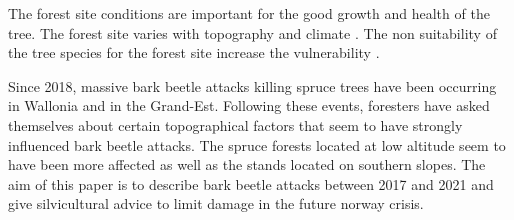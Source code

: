 \documentclass[3p,procedia]{elsarticle}
\begin{document}
 


The forest site conditions are important for the good growth and health of the tree.
The forest site varies with topography and climate \citep{brethes_typologie_1989}.
The non suitability of the tree species for the forest site increase the vulnerability \citep{jandl_climate-induced_2020}.

Since 2018, massive bark beetle attacks killing spruce trees have been occurring in Wallonia and in the Grand-Est. Following these events, foresters have asked themselves about certain topographical factors that seem to have strongly influenced bark beetle attacks. 
The spruce forests located at low altitude seem to have been more affected as well as the stands located on southern slopes.
The aim of this paper is to describe bark beetle attacks between 2017 and 2021 and give silvicultural advice to limit damage in the future norway crisis.  









\end{document}
